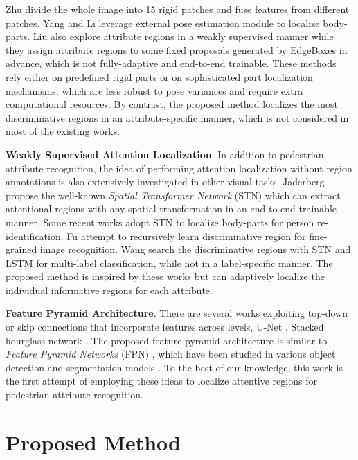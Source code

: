 \documentclass[10pt,twocolumn,letterpaper]{article}
\begin{document}
Zhu \etal \cite{zhu2015multi} divide the whole image into 15 rigid patches and fuse features from different patches.
Yang \etal \cite{yang2016attribute} and Li \etal \cite{li2018pose} leverage external pose estimation module to localize body-parts.
Liu \etal \cite{liu2018localization} also explore attribute regions in a weakly supervised manner while they assign attribute regions to some fixed proposals generated by EdgeBoxes \cite{Zitnick2014EdgeBL} in advance, which is not fully-adaptive and end-to-end trainable.
These methods rely either on predefined rigid parts or on sophisticated part localization mechanisms, which are less robust to pose variances and require extra computational resources.
By contrast, the proposed method localizes the most discriminative regions in an attribute-specific manner, which is not considered in most of the existing works.

\textbf{Weakly Supervised Attention Localization}.
In addition to pedestrian attribute recognition, the idea of performing attention localization without region annotations is also extensively investigated in other visual tasks.
Jaderberg \etal \cite{stn} propose the well-known \textit{Spatial Transformer Network} (STN) which can extract attentional regions with any spatial transformation in an end-to-end trainable manner.
Some recent works \cite{li2017learning,li2018harmonious} adopt STN to localize body-parts for person re-identification.
Fu \etal \cite{fu2017look} attempt to recursively learn discriminative region for fine-grained image recognition.
Wang \etal \cite{wang2017multi} search the discriminative regions with STN and LSTM for multi-label classification, while not in a label-specific manner.
The proposed method is inspired by these works but can adaptively localize the individual informative regions for each attribute.

\textbf{Feature Pyramid Architecture}.
There are several works exploiting top-down or skip connections that incorporate features across levels, \eg U-Net \cite{ronneberger2015u}, Stacked hourglass network \cite{newell2016stacked}.
The proposed feature pyramid architecture is similar to \textit{Feature Pyramid Networks} (FPN) \cite{fpn}, which have been studied in various object detection and segmentation models \cite{shrivastava2016beyond,zhu2018bidirectional}.
To the best of our knowledge, this work is the first attempt of employing these ideas to localize attentive regions for pedestrian attribute recognition.



\section{Proposed Method}
\end{document}
